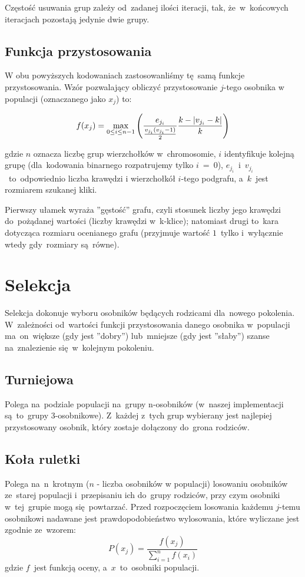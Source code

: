 \documentclass[11pt]{aghdpl}
\begin{document}
Częstość usuwania grup zależy od~zadanej ilości iteracji, tak, że~w~końcowych iteracjach pozostają jedynie dwie grupy.

\section{Funkcja przystosowania}
\label{sec:fitnessFunction}
W obu powyższych kodowaniach zastosowanliśmy tę~samą funkcje przystosowania. Wzór pozwalający
obliczyć przystosowanie $j$-tego osobnika w populacji (oznaczanego jako $x_j$) to:           

$$
f(x_j) = \smash{\displaystyle\max_{0 \leq i \leq n-1}} \left(\frac{e_{j_i}}{\frac{v_{j_i}(v_{j_i} - 1)}{2}}\frac{k - |v_{j_i} - k|}{k}\right) 
$$

gdzie $n$ oznacza liczbę grup wierzchołków w~chromosomie, $i$ identyfikuje kolejną grupę 
(dla~kodowania binarnego rozpatrujemy tylko $i~=~0$), $e_{j_i}$~i~$v_{j_i}$~to~odpowiednio liczba krawędzi i wierzchołkół $i$-tego podgrafu, a~$k$~jest
rozmiarem szukanej kliki.

Pierwszy ułamek wyraża ''gęstość'' grafu, czyli stosunek liczby jego krawędzi do~pożądanej wartości (liczby krawędzi w~k-klice); natomiast
drugi to~kara dotycząca rozmiaru ocenianego grafu (przyjmuje wartość $1$~tylko i~wyłącznie wtedy gdy~rozmiary są~równe).

\chapter{Selekcja}
\label{cha:selection}
Selekcja dokonuje wyboru osobników będących rodzicami dla~nowego pokolenia.
W~zależności od~wartości funkcji przystosowania danego osobnika w~populacji ma~on~większe (gdy jest ''dobry'') lub~mniejsze 
(gdy jest ''słaby'') szanse na~znalezienie się~w~kolejnym pokoleniu. 
\section{Turniejowa}
\label{sec:tournament}
Polega na~podziale populacji na~grupy n-osobników (w~naszej implementacji są~to~grupy 3-osobnikowe). Z~każdej 
z~tych grup wybierany jest najlepiej przystosowany osobnik, który zostaje dołączony do~grona rodziców.

\section{Koła ruletki}
\label{sec:roulette}
Polega na~n~krotnym ($n$ - liczba osobników w populacji) losowaniu osobników ze~starej populacji i~przepisaniu ich do~grupy rodziców,
przy czym osobniki w~tej~grupie mogą się~powtarzać. Przed rozpoczęciem losowania każdemu $j$-temu osobnikowi nadawane jest prawdopodobieństwo wylosowania, 
które wyliczane jest zgodnie ze~wzorem:
$$
P(x_j) = \frac{f(x_j)}{\sum\limits_{i=1}^n{f(x_i)}}
$$
gdzie $f$~jest funkcją oceny, a~$x$~to~osobniki populacji.
 
\end{document}

